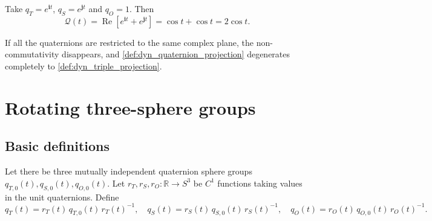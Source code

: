 \begin{example}\label{ex:dyn_quaternion_example}
Take $q_T=e^{\mathbf i t}$, $q_S=e^{\mathbf j t}$ and $q_O=1$. Then
\[
\mathcal Q(t)=\operatorname{Re}[e^{\mathbf i t}+e^{\mathbf j t}]=\cos t+\cos t=2\cos t.
\]
\end{example}

\begin{remark}\label{rem:dyn_quaternion_complex_correspondence}
If all the quaternions are restricted to the same complex plane, the non-commutativity disappears, and \cref{def:dyn_quaternion_projection} degenerates completely to \cref{def:dyn_triple_projection}.
\end{remark}

\section{Rotating three-sphere groups}
\label{sec:dyn_quaternion_triple}

\subsection{Basic definitions}

\begin{definition}\label{def:dyn_rotating_quaternion_groups}
Let there be three mutually independent quaternion sphere groups $q_{T,0}(t),q_{S,0}(t),q_{O,0}(t)$. Let $r_T,r_S,r_O:\mathbb R\to S^3$ be $C^1$ functions taking values in the unit quaternions. Define
\[
q_T(t)=r_T(t)\,q_{T,0}(t)\,r_T(t)^{-1},\quad
q_S(t)=r_S(t)\,q_{S,0}(t)\,r_S(t)^{-1},\quad
q_O(t)=r_O(t)\,q_{O,0}(t)\,r_O(t)^{-1}.
\]
\end{definition}

